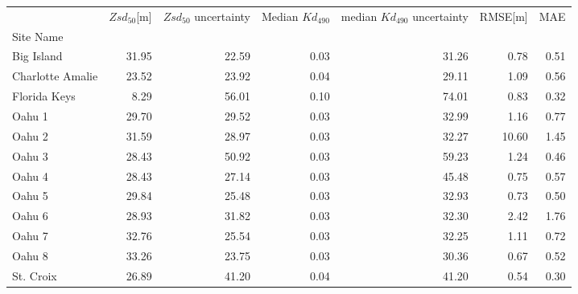 \begin{table}
\centering
\label{tab:ocean_color_summary_by_site}
\begin{tabular}{lrrrrrr}
\toprule
{} &  $Zsd_{50}$[m] &  $Zsd_{50}$ uncertainty &  Median $Kd_{490}$ &  median $Kd_{490}$ uncertainty &  RMSE[m] &  MAE \\
Site Name        &                &                         &                    &                                &          &      \\
\midrule
Big Island       &          31.95 &                   22.59 &               0.03 &                          31.26 &     0.78 & 0.51 \\
Charlotte Amalie &          23.52 &                   23.92 &               0.04 &                          29.11 &     1.09 & 0.56 \\
Florida Keys     &           8.29 &                   56.01 &               0.10 &                          74.01 &     0.83 & 0.32 \\
Oahu 1           &          29.70 &                   29.52 &               0.03 &                          32.99 &     1.16 & 0.77 \\
Oahu 2           &          31.59 &                   28.97 &               0.03 &                          32.27 &    10.60 & 1.45 \\
Oahu 3           &          28.43 &                   50.92 &               0.03 &                          59.23 &     1.24 & 0.46 \\
Oahu 4           &          28.43 &                   27.14 &               0.03 &                          45.48 &     0.75 & 0.57 \\
Oahu 5           &          29.84 &                   25.48 &               0.03 &                          32.93 &     0.73 & 0.50 \\
Oahu 6           &          28.93 &                   31.82 &               0.03 &                          32.30 &     2.42 & 1.76 \\
Oahu 7           &          32.76 &                   25.54 &               0.03 &                          32.25 &     1.11 & 0.72 \\
Oahu 8           &          33.26 &                   23.75 &               0.03 &                          30.36 &     0.67 & 0.52 \\
St. Croix        &          26.89 &                   41.20 &               0.04 &                          41.20 &     0.54 & 0.30 \\
\bottomrule
\end{tabular}
\end{table}
